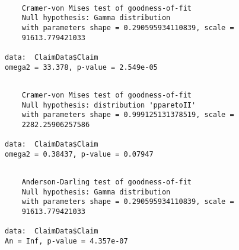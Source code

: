 \documentclass[]{book}
\newenvironment{Shaded}{\begin{snugshade}}{\end{snugshade}}
\newcommand{\KeywordTok}[1]{\textcolor[rgb]{0.13,0.29,0.53}{\textbf{#1}}}
\newcommand{\DataTypeTok}[1]{\textcolor[rgb]{0.13,0.29,0.53}{#1}}
\newcommand{\DecValTok}[1]{\textcolor[rgb]{0.00,0.00,0.81}{#1}}
\newcommand{\StringTok}[1]{\textcolor[rgb]{0.31,0.60,0.02}{#1}}
\newcommand{\CommentTok}[1]{\textcolor[rgb]{0.56,0.35,0.01}{\textit{#1}}}
\newcommand{\OperatorTok}[1]{\textcolor[rgb]{0.81,0.36,0.00}{\textbf{#1}}}
\newcommand{\NormalTok}[1]{#1}
\theoremstyle{definition}
\theoremstyle{definition}
\theoremstyle{definition}
\theoremstyle{remark}
\begin{document}
\begin{verbatim}

    Cramer-von Mises test of goodness-of-fit
    Null hypothesis: Gamma distribution
    with parameters shape = 0.290595934110839, scale =
    91613.779421033

data:  ClaimData$Claim
omega2 = 33.378, p-value = 2.549e-05
\end{verbatim}

\begin{Shaded}
\end{Shaded}

\begin{verbatim}

    Cramer-von Mises test of goodness-of-fit
    Null hypothesis: distribution 'pparetoII'
    with parameters shape = 0.999125131378519, scale =
    2282.25906257586

data:  ClaimData$Claim
omega2 = 0.38437, p-value = 0.07947
\end{verbatim}

\begin{Shaded}
\end{Shaded}

\begin{verbatim}

    Anderson-Darling test of goodness-of-fit
    Null hypothesis: Gamma distribution
    with parameters shape = 0.290595934110839, scale =
    91613.779421033

data:  ClaimData$Claim
An = Inf, p-value = 4.357e-07
\end{verbatim}

\begin{Shaded}
\end{Shaded}
\end{document}

